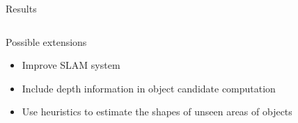 \documentclass[final,20pt]{beamer}
\newlength{\sepwid}
\newlength{\onecolwid}
\newlength{\twocolwid}
\begin{document}
\begin{frame}[t]
\begin{columns}[t]
\begin{column}{\twocolwid}
\begin{block}{Results}
\begin{columns}[t, totalwidth=\twocolwid]
\begin{column}{\onecolwid}
\begin{block}{Possible extensions}
		\large{
				\begin{itemize}
					\item Improve SLAM system
					\item Include depth information in object candidate computation
					\item Use heuristics to estimate the shapes of unseen areas of objects
				\end{itemize}}

		\end{block}

		\vspace{1cm}


  \end{column}
	
\end{columns}

\end{block}






		



\end{column}
\end{columns}
\end{frame}
\end{document}
